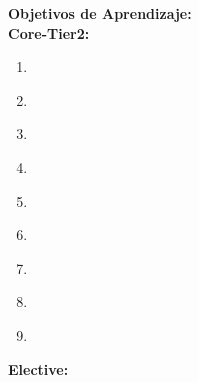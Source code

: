 \noindent \textbf{Objetivos de Aprendizaje:}\\
\noindent \textbf{Core-Tier2:}
\begin{enumerate}
	\setcounter{enumi}{0}
	\item \SESoftwareVerificationandValidationLODistinguishBetween\xspace[\SESoftwareVerificationandValidationLODistinguishBetweenLevel]\label{sec:BOK:SESoftwareVerificationandValidationLODistinguishBetween}
	\item \SESoftwareVerificationandValidationLODescribeTheTools\xspace[\SESoftwareVerificationandValidationLODescribeTheToolsLevel]\label{sec:BOK:SESoftwareVerificationandValidationLODescribeTheTools}
	\item \SESoftwareVerificationandValidationLOUndertake\xspace[\SESoftwareVerificationandValidationLOUndertakeLevel]\label{sec:BOK:SESoftwareVerificationandValidationLOUndertake}
	\item \SESoftwareVerificationandValidationLODescribeAnd\xspace[\SESoftwareVerificationandValidationLODescribeAndLevel]\label{sec:BOK:SESoftwareVerificationandValidationLODescribeAnd}
	\item \SESoftwareVerificationandValidationLODescribeTechniquesSignificant\xspace[\SESoftwareVerificationandValidationLODescribeTechniquesSignificantLevel]\label{sec:BOK:SESoftwareVerificationandValidationLODescribeTechniquesSignificant}
	\item \SESoftwareVerificationandValidationLOCreateAndSet\xspace[\SESoftwareVerificationandValidationLOCreateAndSetLevel]\label{sec:BOK:SESoftwareVerificationandValidationLOCreateAndSet}
	\item \SESoftwareVerificationandValidationLODescribeHowGood\xspace[\SESoftwareVerificationandValidationLODescribeHowGoodLevel]\label{sec:BOK:SESoftwareVerificationandValidationLODescribeHowGood}
	\item \SESoftwareVerificationandValidationLOUseAToolSoftware\xspace[\SESoftwareVerificationandValidationLOUseAToolSoftwareLevel]\label{sec:BOK:SESoftwareVerificationandValidationLOUseAToolSoftware}
	\item \SESoftwareVerificationandValidationLODiscussTheTesting\xspace[\SESoftwareVerificationandValidationLODiscussTheTestingLevel]\label{sec:BOK:SESoftwareVerificationandValidationLODiscussTheTesting}
\end{enumerate}
\noindent \textbf{Elective:}
